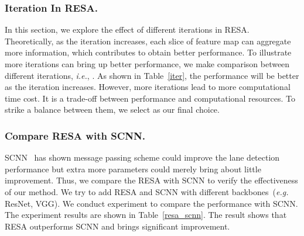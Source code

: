 \documentclass[letterpaper]{article} \usepackage{aaai21}  \usepackage{times}  \usepackage{helvet} \usepackage{courier}  \usepackage[hyphens]{url}  \usepackage{graphicx} \urlstyle{rm} \def\UrlFont{\rm}  \usepackage{natbib}  \usepackage{caption} \frenchspacing  \setlength{\pdfpagewidth}{8.5in}  \setlength{\pdfpageheight}{11in}  \usepackage{amsmath}
\begin{document}
\subsubsection{Iteration In RESA.}
In this section, we explore the effect of different iterations in RESA. Theoretically, as the iteration increases, each slice of feature map can aggregate more information, which contributes to obtain better performance. To illustrate more iterations can bring up better performance, we make comparison between different iterations, \emph{i.e.}, . As shown in Table~\ref{iter}, the performance will be better as the iteration increases. However, more iterations lead to more computational time cost. It is a trade-off between performance and computational resources. To strike a balance between them, we select  as our final choice.

\begin{table}[!tbh]
\centering
{}
\caption{The performance of the model by using different iterations on CULane dataset with ResNet-34 backbone.}
\label{iter}
\vspace{-10pt}
\end{table}



\subsubsection{Compare RESA with SCNN.}
SCNN~\citep{pan2018spatial} has shown message passing scheme could improve the lane detection performance but extra more parameters could merely bring about little improvement. Thus, we compare the RESA with SCNN to verify the effectiveness of our method.  We try to add RESA and SCNN with different backbones~(\emph{e.g.} ResNet, VGG). We conduct experiment to compare the performance with SCNN. The experiment results are shown in Table~\ref{resa_scnn}. The result shows that RESA outperforms SCNN and brings significant improvement. 
\end{document}
